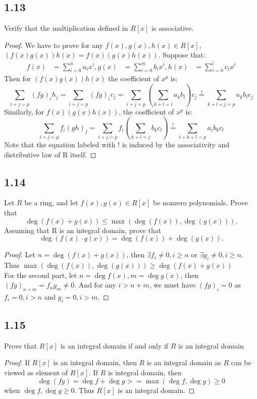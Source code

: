 \documentclass[a4paper, pdf, 12pt]{article}
\begin{document}
\subsection*{1.13}
Verify that the multiplication deﬁned in $R[x]$ is associative.
\begin{proof}
  We have to prove for any $f(x), g(x), h(x)\in R[x]$, $(f(x)g(x))h(x) = f(x)(g(x)h(x))$. 
  Suppose that:
  $$
  \begin{aligned}
    f(x) &= \sum_{i=0}^{n}a_{i}x^{i},
    g(x) &= \sum_{i=0}^{m}b_{i}x^{i},
    h(x) &= \sum_{i=0}^{l}c_{i}x^{i}
  \end{aligned}
  $$
  Then for $(f(x)g(x))h(x)$ the coefficient of $x^{p}$ is:
  $$
  \sum_{i+j=p}(fg)_{i}h_{j} = \sum_{i+j=p}(fg)_{i}c_{j}=\sum_{i+j=p}(\sum_{k+l=i}a_{k}b_{l})c_{j}\stackrel{!}{=}\sum_{k+l+j=p}a_kb_lc_j
  $$
  Similarly, for $f(x)(g(x)h(x))$, the coefficient of $x^{p}$ is:
  $$
  \sum_{i+j=p}f_{i}(gh)_{j}=\sum_{i+j=p}f_{i}(\sum_{k+l=j}b_kc_l)\stackrel{!}{=}\sum_{i+k+l=p}a_{i}b_{k}c_{l}
  $$
  Note that the equation labeled with $!$ is induced by the associativity and distributive law of R itself.
\end{proof}

\subsection*{1.14}
Let $R$ be a ring, and let $f(x), g(x) \in R[x]$ be nonzero polynomials. Prove that 
$$
\deg(f(x) + g(x)) \leq \max(\deg(f(x)), \deg(g(x))) .
$$
\noindent
Assuming that R is an integral domain, prove that
$$
\deg(f(x) · g(x)) = \deg(f(x)) + \deg(g(x)).
$$
\begin{proof}
  Let $n=\deg (f(x) + g(x))$, then $\exists f_{i}\neq 0, i\geq n$ or $\exists g_{i}\neq 0, i\geq n$. Thus 
  $\max(\deg(f(x)), \deg(g(x)))\geq \deg (f(x) + g(x))$\\

  For the second part, let $n=\deg f(x), m=\deg g(x)$, then $(fg)_{n+m} = f_{n}g_{m}\neq 0$. And for any $i > n+m$, 
  we must have $(fg)_{i} = 0$ as $f_{i} = 0, i > n$ and $g_{i} = 0, i > m$.
\end{proof}

\subsection*{1.15}
Prove that $R[x]$ is an integral domain if and only if $R$ is an integral domain
\begin{proof}
  If $R[x]$ is an integral domain, then $R$ is an integral domain as $R$ can be viewed as 
  element of $R[x]$. If $R$ is integral domain, then $$\deg (fg) = \deg f + \deg g >= \max (\deg f, \deg g) \geq 0$$ 
  when $\deg f,\deg g\geq 0$. Thus $R[x]$ is an integral domain.
\end{proof}
\end{document}
